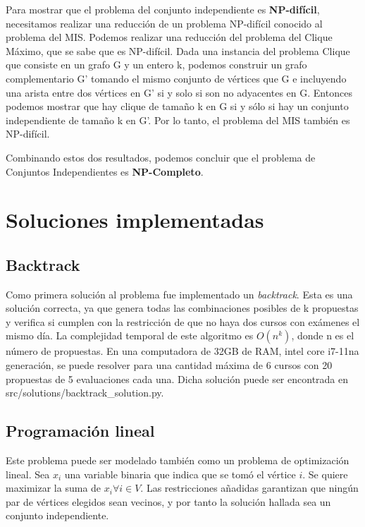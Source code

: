 \documentclass[10pt]{article} %
\begin{document}
	Para mostrar que el problema del conjunto independiente es \textbf{NP-difícil}, necesitamos realizar una reducción de un problema NP-difícil conocido al problema del MIS. Podemos realizar una reducción del problema del Clique M\'aximo, que se sabe que es NP-difícil. Dada una instancia del problema Clique que consiste en un grafo G y un entero k, podemos construir un grafo complementario G' tomando el mismo conjunto de vértices que G e incluyendo una arista entre dos vértices en G' si y solo si son no adyacentes en G. Entonces podemos mostrar que hay clique de tamaño k en G si y sólo si hay un conjunto independiente de tamaño k en G'. Por lo tanto, el problema del MIS también es NP-difícil.

	Combinando estos dos resultados, podemos concluir que el problema de Conjuntos Independientes es \textbf{NP-Completo}.
	
	\section{Soluciones implementadas}
	
	\subsection{Backtrack}
	
		Como primera solución al problema fue implementado un \textit{backtrack}. Esta es una solución correcta, ya que  genera todas las combinaciones posibles de k propuestas y verifica si cumplen con la restricción de que no haya dos cursos con exámenes el mismo día. La complejidad temporal de este algoritmo es $O(n^k)$, donde n es el número de propuestas. En una computadora de 32GB de RAM, intel core i7-11na generación, se puede resolver para una cantidad máxima de 6 cursos con 20 propuestas de 5 evaluaciones cada una. Dicha solución puede ser encontrada en src/solutions/backtrack\_solution.py.
		
	\subsection{Programaci\'on lineal}
	
	Este problema puede ser modelado tambi\'en como un problema de optimizaci\'on lineal. Sea $ x_{i} $ una variable binaria que indica que se tom\'o el v\'ertice $ i $. Se quiere maximizar la suma de $ x_i \forall i \in V $. Las restricciones a\~nadidas  garantizan que ning\'un par de v\'ertices elegidos sean vecinos, y por tanto la soluci\'on hallada sea un conjunto independiente. 
		
\end{document}
